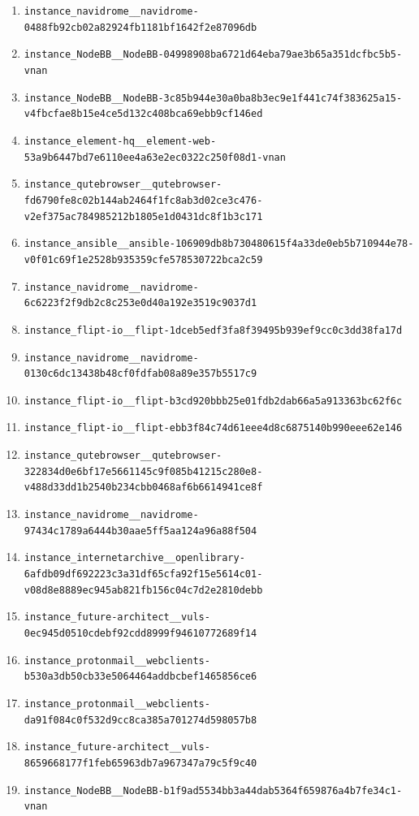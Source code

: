 \documentclass{llmxive}
\begin{document}
\begin{enumerate}
\item \texttt{instance\_navidrome\_\_navidrome-0488fb92cb02a82924fb1181bf1642f2e87096db}
\item \texttt{instance\_NodeBB\_\_NodeBB-04998908ba6721d64eba79ae3b65a351dcfbc5b5-vnan}
\item \texttt{instance\_NodeBB\_\_NodeBB-3c85b944e30a0ba8b3ec9e1f441c74f383625a15-v4fbcfae8b15e4ce5d132c408bca69ebb9cf146ed}
\item \texttt{instance\_element-hq\_\_element-web-53a9b6447bd7e6110ee4a63e2ec0322c250f08d1-vnan}
\item \texttt{instance\_qutebrowser\_\_qutebrowser-fd6790fe8c02b144ab2464f1fc8ab3d02ce3c476-v2ef375ac784985212b1805e1d0431dc8f1b3c171}
\item \texttt{instance\_ansible\_\_ansible-106909db8b730480615f4a33de0eb5b710944e78-v0f01c69f1e2528b935359cfe578530722bca2c59}
\item \texttt{instance\_navidrome\_\_navidrome-6c6223f2f9db2c8c253e0d40a192e3519c9037d1}
\item \texttt{instance\_flipt-io\_\_flipt-1dceb5edf3fa8f39495b939ef9cc0c3dd38fa17d}
\item \texttt{instance\_navidrome\_\_navidrome-0130c6dc13438b48cf0fdfab08a89e357b5517c9}
\item \texttt{instance\_flipt-io\_\_flipt-b3cd920bbb25e01fdb2dab66a5a913363bc62f6c}
\item \texttt{instance\_flipt-io\_\_flipt-ebb3f84c74d61eee4d8c6875140b990eee62e146}
\item \texttt{instance\_qutebrowser\_\_qutebrowser-322834d0e6bf17e5661145c9f085b41215c280e8-v488d33dd1b2540b234cbb0468af6b6614941ce8f}
\item \texttt{instance\_navidrome\_\_navidrome-97434c1789a6444b30aae5ff5aa124a96a88f504}
\item \texttt{instance\_internetarchive\_\_openlibrary-6afdb09df692223c3a31df65cfa92f15e5614c01-v08d8e8889ec945ab821fb156c04c7d2e2810debb}
\item \texttt{instance\_future-architect\_\_vuls-0ec945d0510cdebf92cdd8999f94610772689f14}
\item \texttt{instance\_protonmail\_\_webclients-b530a3db50cb33e5064464addbcbef1465856ce6}
\item \texttt{instance\_protonmail\_\_webclients-da91f084c0f532d9cc8ca385a701274d598057b8}
\item \texttt{instance\_future-architect\_\_vuls-8659668177f1feb65963db7a967347a79c5f9c40}
\item \texttt{instance\_NodeBB\_\_NodeBB-b1f9ad5534bb3a44dab5364f659876a4b7fe34c1-vnan}

\end{enumerate}
\end{document}
